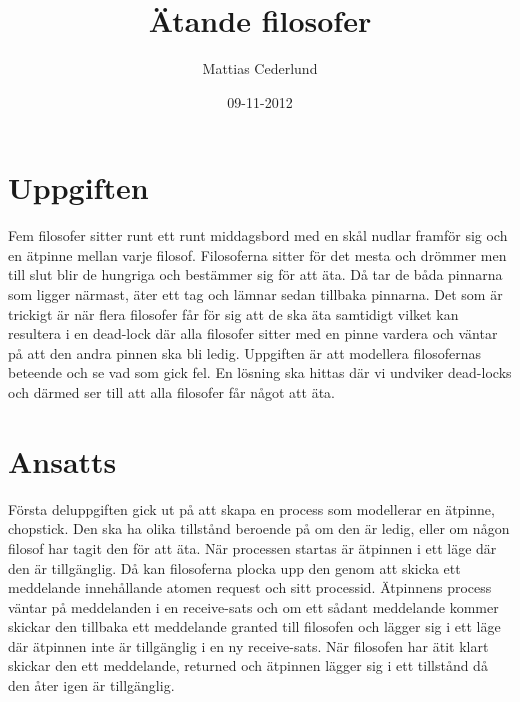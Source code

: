 \documentclass[a4paper, 11pt]{article}
\title{Ätande filosofer}
\author{Mattias Cederlund}
\date{09-11-2012}
\begin{document}
\maketitle 

\section{Uppgiften}

Fem filosofer sitter runt ett runt middagsbord med en skål nudlar framför sig och en ätpinne mellan varje filosof. Filosoferna sitter för det mesta och drömmer men till slut blir de hungriga och bestämmer sig för att äta. Då tar de båda pinnarna som ligger närmast, äter ett tag och lämnar sedan tillbaka pinnarna. Det som är trickigt är när flera filosofer får för sig att de ska äta samtidigt vilket kan resultera i en dead-lock där alla filosofer sitter med en pinne vardera och väntar på att den andra pinnen ska bli ledig. Uppgiften är att modellera filosofernas beteende och se vad som gick fel. En lösning ska hittas där vi undviker dead-locks och därmed ser till att alla filosofer får något att äta.

\section{Ansatts}

Första deluppgiften gick ut på att skapa en process som modellerar en ätpinne, chopstick. Den ska ha olika tillstånd beroende på om den är ledig, eller om någon filosof har tagit den för att äta. När processen startas är ätpinnen i ett läge där den är tillgänglig. Då kan filosoferna plocka upp den genom att skicka ett meddelande innehållande atomen request och sitt processid. Ätpinnens process väntar på meddelanden i en receive-sats och om ett sådant meddelande kommer skickar den tillbaka ett meddelande granted till filosofen och lägger sig i ett läge där ätpinnen inte är tillgänglig i en ny receive-sats. När filosofen har ätit klart skickar den ett meddelande, returned och ätpinnen lägger sig i ett tillstånd då den åter igen är tillgänglig.
\end{document}
